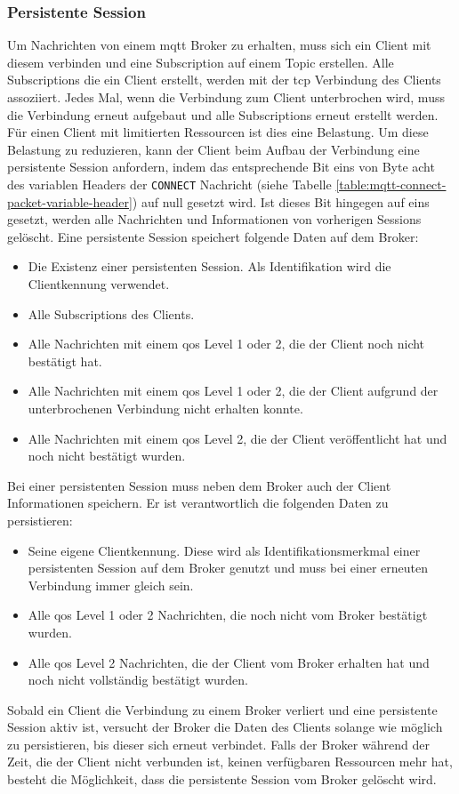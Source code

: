 \subsubsection{Persistente Session} \label{s:persistent-session}
Um Nachrichten von einem \ac{mqtt} Broker zu erhalten, muss sich ein Client mit diesem verbinden und eine Subscription auf einem Topic erstellen. Alle Subscriptions die ein Client erstellt, werden mit der \ac{tcp} Verbindung des Clients assoziiert.
Jedes Mal, wenn die Verbindung zum Client unterbrochen wird, muss die Verbindung erneut aufgebaut und alle Subscriptions erneut erstellt werden.
Für einen Client mit limitierten Ressourcen ist dies eine Belastung.
Um diese Belastung zu reduzieren, kann der Client beim Aufbau der Verbindung eine persistente Session anfordern, indem das entsprechende Bit eins von Byte acht des variablen Headers der \verb|CONNECT| Nachricht (siehe Tabelle \ref{table:mqtt-connect-packet-variable-header}) auf null gesetzt wird.
Ist dieses Bit hingegen auf eins gesetzt, werden alle Nachrichten und Informationen von vorherigen Sessions gelöscht.
Eine persistente Session speichert folgende Daten auf dem Broker:
\begin{itemize}
    \item Die Existenz einer persistenten Session. Als Identifikation wird die Clientkennung verwendet.
    \item Alle Subscriptions des Clients.
    \item Alle Nachrichten mit einem \ac{qos} Level 1 oder 2, die der Client noch nicht bestätigt hat.
    \item Alle Nachrichten mit einem \ac{qos} Level 1 oder 2, die der Client aufgrund der unterbrochenen Verbindung nicht erhalten konnte.
    \item Alle Nachrichten mit einem \ac{qos} Level 2, die der Client veröffentlicht hat und noch nicht bestätigt wurden.
\end{itemize}
Bei einer persistenten Session muss neben dem Broker auch der Client Informationen speichern. Er ist verantwortlich die folgenden Daten zu persistieren:
\begin{itemize}
    \item Seine eigene Clientkennung. Diese wird als Identifikationsmerkmal einer persistenten Session auf dem Broker genutzt und muss bei einer erneuten Verbindung immer gleich sein.
    \item Alle \ac{qos} Level 1 oder 2 Nachrichten, die noch nicht vom Broker bestätigt wurden.
    \item Alle \ac{qos} Level 2 Nachrichten, die der Client vom Broker erhalten hat und noch nicht vollständig bestätigt wurden.
\end{itemize}
Sobald ein Client die Verbindung zu einem Broker verliert und eine persistente Session aktiv ist, versucht der Broker die Daten des Clients solange wie möglich zu persistieren, bis dieser sich erneut verbindet. Falls der Broker während der Zeit, die der Client nicht verbunden ist, keinen verfügbaren Ressourcen mehr hat, besteht die Möglichkeit, dass die persistente Session vom Broker gelöscht wird.
\cite{teamPersistentSessionQueuing}

